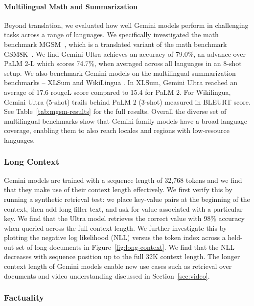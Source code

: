\paragraph{Multilingual Math and Summarization}
\label{sec:multilingualmath}
Beyond translation, we evaluated how well Gemini models perform in challenging tasks across a range of languages. We specifically investigated the math benchmark MGSM~\cite{mgsm}, which is a translated variant of the math benchmark GSM8K~\citep{cobbe2021training}. We find Gemini Ultra achieves an accuracy of 79.0\%, an advance over PaLM 2-L which scores 74.7\%, when averaged across all languages in an 8-shot setup. We also benchmark Gemini models on the multilingual summarization benchmarks – XLSum \cite{hasan-etal-2021-xl} and WikiLingua \cite{ladhak2020wikilingua}. In XLSum, Gemini Ultra reached an average of 17.6 rougeL score compared to 15.4 for PaLM 2. For Wikilingua, Gemini Ultra (5-shot) trails behind PaLM 2 (3-shot) measured in BLEURT score. See Table~\ref{tab:mgsm-results} for the full results.  Overall the diverse set of multilingual benchmarks show that Gemini family models have a broad language coverage, enabling them to also reach locales and regions with low-resource languages.

\subsubsection{Long Context}
\label{sec:longcontext}
Gemini models are trained with a sequence length of 32,768 tokens and we find that they make use of their context length effectively. We first verify this by running a synthetic retrieval test: we place key-value pairs at the beginning of the context, then add long filler text, and ask for value associated with a particular key. We find that the Ultra model retrieves the correct value with 98\% accuracy when queried across the full context length. We further investigate this by plotting the negative log likelihood (NLL) versus the token index across a held-out set of long documents in Figure~\ref{fig:long-context}. We find that the NLL decreases with sequence position up to the full 32K context length. The longer context length of Gemini models enable new use cases such as retrieval over documents and video understanding discussed in Section~\ref{sec:video}.

\subsubsection{Factuality}

